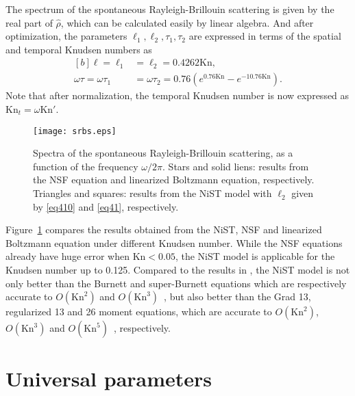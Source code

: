 \documentclass[lineno]{jfm}
\begin{document}
The spectrum of the spontaneous Rayleigh-Brillouin scattering is given by the real part of $\hat{\rho}$, which can be calculated easily by linear algebra. And after optimization, the parameters $\ell_1, \ell_2, \tau_1, \tau_2$ are expressed in terms of the spatial and temporal Knudsen numbers as
 \begin{equation}\label{eq410}
 \begin{aligned}[b]
 		\ell=\ell_{1} &= \ell_{2} = 0.4262\text{Kn}, \\
 		\omega\tau=\omega\tau_{1} &= \omega\tau_{2} = 0.76\left(e^{0.76\text{Kn}}-e^{-10.76\text{Kn}}\right).
 	\end{aligned}
 \end{equation}
Note that after normalization, the temporal Knudsen number is now expressed as 
$\text{Kn}_t=\omega \text{Kn}'$. 

\begin{figure}
	\centering
	\texttt{[image: srbs.eps]}
	\caption{Spectra of the spontaneous Rayleigh-Brillouin scattering, as a function of the frequency $\omega/2\pi$. Stars and solid liens: results from the NSF equation and linearized Boltzmann equation, respectively. Triangles and squares: results from the NiST model with $\ell_2$ given by \eqref{eq410} and \eqref{eq41}, respectively. }
	\label{srbs}
\end{figure}

Figure~\ref{srbs} compares the results obtained from the NiST, NSF and linearized Boltzmann equation under different Knudsen number. While the NSF equations already have huge error when $\text{Kn}<0.05$, the NiST model is applicable  for the Knudsen number up to 0.125. Compared to the results in \cite{cite8}, the NiST model is not only better than the Burnett and super-Burnett equations which are respectively accurate to $O(\text{Kn}^2)$ and $O(\text{Kn}^3)$~\citep{GarciaColin2008}, but also better than the Grad 13, regularized 13 and 26 moment equations, which are accurate to $O(\text{Kn}^2)$, $O(\text{Kn}^3)$ and $O(\text{Kn}^5)$~\citep{henning,Gu2009JFM,TorrihonReview2016}, respectively. 


\section{Universal parameters}\label{univesal}
 
\end{document}
